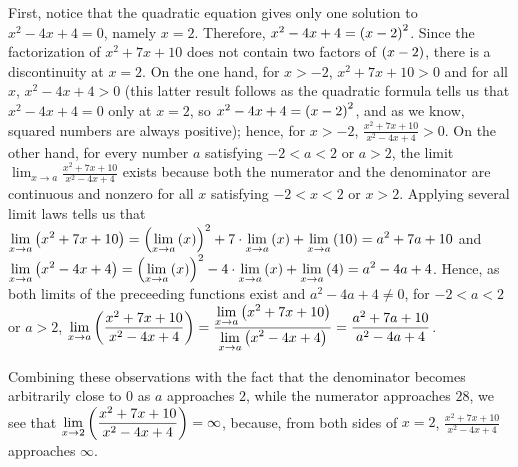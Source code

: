 \documentclass{ximera}
\begin{document}
\begin{exercise}
\begin{hint}
    First, notice that the quadratic equation gives only one solution to $x^2-4x+4=0$, namely $x=2$. Therefore, $x^2-4x+4=\left(x-2\right)^2$. Since the factorization of $x^2+7x+10$ does not contain two factors of $\left(x-2\right)$, there is a discontinuity at $x=2$. On the one hand, for $x>-2$, $x^2+7x+10>0$ and for all $x$, $x^2-4x+4>0$ (this latter result follows as the quadratic formula tells us that $x^2-4x+4=0$ only at $x=2$, so $x^2-4x+4=\left(x-2\right)^2$, and as we know, squared numbers are always positive); hence, for $x>-2$, $\frac{x^2+7x+10}{x^2-4x+4}>0$. On the other hand, for every number $a$ satisfying $-2<a<2$ or $a>2$, the limit $\lim_{x\to a}\frac{x^2+7x+10}{x^2-4x+4}$ exists because both the numerator and the denominator are continuous and nonzero for all $x$ satisfying $-2<x<2$ or $x>2$. Applying several limit laws tells us that $\lim_{x\to a}\p{x^2+7x+10}=\p{\lim_{x\to a}\p{x}}^2+7\cdot\lim_{x\to a}\p{x}+\lim_{x\to a}\p{10}=a^2+7a+10$ and $\lim_{x\to a}\p{x^2-4x+4}=\p{\lim_{x\to a}\p{x}}^2-4\cdot\lim_{x\to a}\p{x}+\lim_{x\to a}\p{4}=a^2-4a+4$. Hence, as both limits of the preceeding functions exist and $a^2-4a+4\ne0$, for  $-2<a<2$ or $a>2$, $\lim_{x\to a}\p{\frac{x^2+7x+10}{x^2-4x+4}}=\frac{\lim_{x\to a}\p{x^2+7x+10}}{\lim_{x\to a}\p{x^2-4x+4}}=\frac{a^2+7a+10}{a^2-4a+4}$.
    
    Combining these observations with the fact that the denominator becomes arbitrarily close to $0$ as $a$ approaches $2$, while the numerator approaches $28$, we see that $\lim_{x\to 2}\p{\frac{x^2+7x+10}{x^2-4x+4}}=\infty$, because, from both sides of $x=2$, $\frac{x^2+7x+10}{x^2-4x+4}$ approaches $\infty$.
 \end{hint}
\end{exercise}
\end{document}
